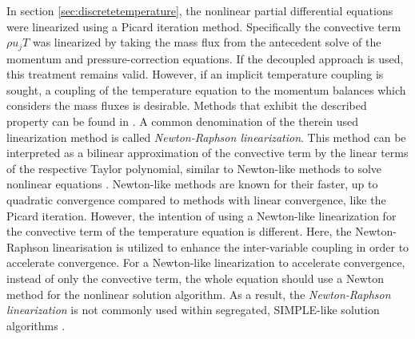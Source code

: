 In section \ref{sec:discretetemperature}, the nonlinear partial differential equations were linearized using a Picard iteration method. Specifically the convective term \(\rho u_j T\) was linearized by taking the mass flux from the antecedent solve of the momentum and pressure-correction equations. If the decoupled approach is used, this treatment remains valid. However, if an implicit temperature coupling is sought, a coupling of the temperature equation to the momentum balances which considers the mass fluxes is desirable. Methods that exhibit the described property can be found in \cite{galpin86,oliveira01,sheu04,vakilipour12}. A common denomination of the therein used linearization method is called \emph{Newton-Raphson linearization}. This method can be interpreted as a bilinear approximation of the convective term by the linear terms of the respective Taylor polynomial, similar to Newton-like methods to solve nonlinear equations \cite{ferziger02}. Newton-like methods are known for their faster, up to quadratic convergence compared to methods with linear convergence, like the Picard iteration. However, the intention of using a Newton-like linearization for the convective term of the temperature equation is different. Here, the Newton-Raphson linearisation is utilized to enhance the inter-variable coupling in order to accelerate convergence. For a Newton-like linearization to accelerate convergence, instead of only the convective term, the whole equation should use a Newton method for the nonlinear solution algorithm. As a result, the \emph{Newton-Raphson linearization} is not commonly used within segregated, SIMPLE-like solution algorithms \cite{ferziger02}.

